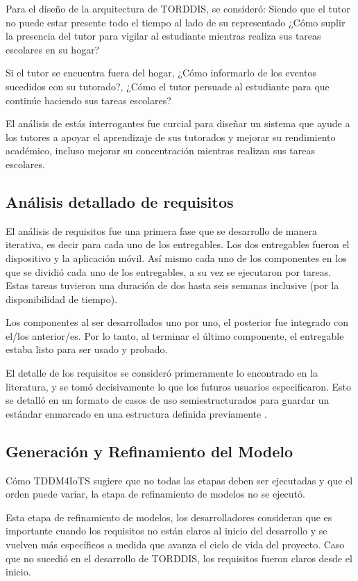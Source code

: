 \documentclass[a4paper,fleqn]{cas-sc}
\begin{document}
			Para el diseño de la arquitectura de TORDDIS, se consideró: Siendo que el tutor no puede estar presente todo el tiempo al lado de su representado ¿Cómo suplir la presencia del tutor para vigilar al estudiante mientras realiza sus tareas escolares en su hogar?
			
			Si el tutor se encuentra fuera del hogar, ¿Cómo informarlo de los eventos sucedidos con su tutorado?, ¿Cómo el tutor persuade al estudiante para que continúe haciendo sus tareas escolares? 
			
			El análisis de estás interrogantes fue curcial para diseñar un sistema que ayude a los tutores a apoyar el aprendizaje de sus tutorados y mejorar su rendimiento académico, incluso mejorar su concentración mientras realizan sus tareas escolares.
			
		\subsection{Análisis detallado de requisitos}
			El análisis de requisitos fue una primera fase que se desarrollo de manera iterativa, es decir para cada uno de los entregables. Los dos entregables fueron el dispositivo y la aplicación móvil. Así mismo cada uno de los componentes en los que se dividió cada uno de los entregables, a su vez se ejecutaron por tareas. Estas tareas tuvieron una duración de dos hasta seis semanas inclusive (por la disponibilidad de tiempo).
			
			Los componentes al ser desarrollados uno por uno, el posterior fue integrado con el/los anterior/es. Por lo tanto, al terminar el último componente, el entregable estaba listo para ser usado y probado.
			
			El detalle de los requisitos se consideró primeramente lo encontrado en la literatura, y se tomó decisivamente lo que los futuros usuarios especificaron. Esto se detalló en un formato de casos de uso semiestructurados para guardar un estándar enmarcado en una estructura definida previamente \cite{Zegzhda2018Use}.
			
		\subsection{Generación y Refinamiento del Modelo}
						Cómo TDDM4IoTS \cite{Guerrero-Ulloa2020TDDM4IoTS} sugiere que no todas las etapas deben ser ejecutadas y que el orden puede variar, la etapa de refinamiento de modelos no se ejecutó.
			
			Esta etapa de refinamiento de modelos, los desarrolladores consideran que es importante cuando los requisitos no están claros al inicio del desarrollo y se vuelven más específicos a medida que avanza el ciclo de vida del proyecto. Caso que no sucedió en el desarrollo de TORDDIS, los requisitos fueron claros desde el inicio.
			
\end{document}

